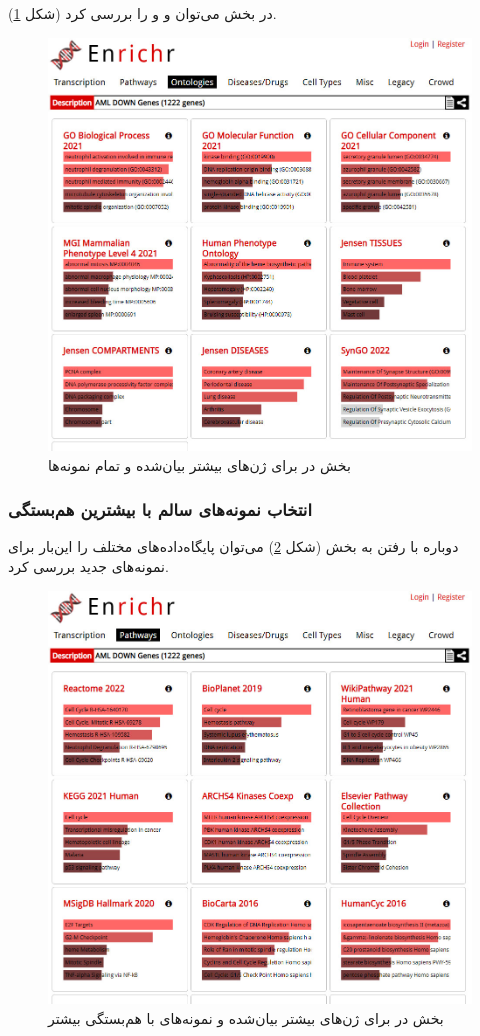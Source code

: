 \documentclass{article}
\begin{document}
در بخش  می‌توان  و  و  را بررسی کرد (شکل \ref{fig:enrichr-ontology-d}).
\begin{figure}[h!]
	\centering
	\includegraphics[width=0.5\columnwidth]{figs/enrichr-ontologies-d-2.jpg}
	\caption{بخش  در  برای ژن‌های بیشتر بیان‌شده و تمام نمونه‌ها}
	\label{fig:enrichr-ontology-d}
\end{figure}

\subsubsection{انتخاب نمونه‌های سالم با بیشترین هم‌بستگی}
دوباره با رفتن به بخش  (شکل \ref{fig:enrichr-pathways-d-2}) می‌توان پایگاه‌داده‌های  مختلف را این‌بار برای نمونه‌های جدید بررسی کرد.
\begin{figure}[h!]
	\centering
	\includegraphics[width=0.5\columnwidth]{figs/enrichr-pathways-d-2.jpg}
	\caption{بخش  در  برای ژن‌های بیشتر بیان‌شده و نمونه‌های با هم‌بستگی بیشتر}
	\label{fig:enrichr-pathways-d-2}
\end{figure}
\end{document}
